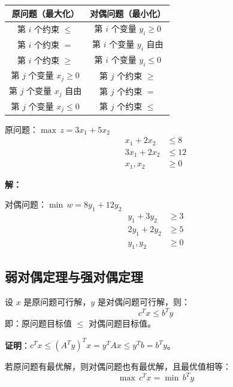 \begin{conceptbox}[原问题与对偶问题的对应关系]
\begin{table}[H]
\centering
\begin{tabular}{@{}cc@{}}
\toprule
\textbf{原问题（最大化）} & \textbf{对偶问题（最小化）} \\
\midrule
第 $i$ 个约束 $\leq$ & 第 $i$ 个变量 $y_i \geq 0$ \\
第 $i$ 个约束 $=$ & 第 $i$ 个变量 $y_i$ 自由 \\
第 $i$ 个约束 $\geq$ & 第 $i$ 个变量 $y_i \leq 0$ \\
\midrule
第 $j$ 个变量 $x_j \geq 0$ & 第 $j$ 个约束 $\geq$ \\
第 $j$ 个变量 $x_j$ 自由 & 第 $j$ 个约束 $=$ \\
第 $j$ 个变量 $x_j \leq 0$ & 第 $j$ 个约束 $\leq$ \\
\bottomrule
\end{tabular}
\end{table}
\end{conceptbox}

\begin{example}[写对偶问题]
原问题：$\max \, z = 3x_1 + 5x_2$
\begin{align*}
x_1 + 2x_2 &\leq 8 \\
3x_1 + 2x_2 &\leq 12 \\
x_1, x_2 &\geq 0
\end{align*}

\textbf{解：}

对偶问题：$\min \, w = 8y_1 + 12y_2$
\begin{align*}
y_1 + 3y_2 &\geq 3 \\
2y_1 + 2y_2 &\geq 5 \\
y_1, y_2 &\geq 0
\end{align*}
\end{example}

\subsection{弱对偶定理与强对偶定理}

\begin{theorem}[弱对偶定理]
设 $x$ 是原问题可行解，$y$ 是对偶问题可行解，则：
\[
c^T x \leq b^T y
\]
即：原问题目标值 $\leq$ 对偶问题目标值。
\end{theorem}

\textbf{证明}：$c^T x \leq (A^T y)^T x = y^T A x \leq y^T b = b^T y$。

\begin{theorem}[强对偶定理]
若原问题有最优解，则对偶问题也有最优解，且最优值相等：
\[
\max \, c^T x = \min \, b^T y
\]
\end{theorem}

